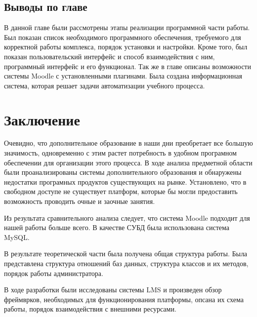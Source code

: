 \documentclass[a4paper,14pt]{article}
\begin{document}

\subsection{Выводы по главе}

В данной главе были рассмотрены этапы реализации программной части работы.
Был показан список необходимого программного обеспечения, требуемого для корректной работы комплекса, порядок установки и настройки.
Кроме того, был показан пользовательский интерфейс и способ взаимодействия с ним, программный интерфейс и его функционал.
Так же в главе описаны возможности системы Moodle с установленными плагинами.
Была создана информационная система, которая решает задачи автоматизации учебного процесса.



\section{Заключение}


Очевидно, что дополнительное образование в наши дни преобретает все большую значимость, одновременно с этим растет потребность в удобном програмном обеспечении для организации этого процесса.
В ходе анализа предметной области были проанализированы системы дополнительного образования и обнаружены недостатки програмных продуктов существующих на рынке.
Установлено, что в свободном доступе не существует платформ, которые бы могли предоставить возможность проводить очные и заочные занятия.

Из результата сравнительного анализа следует, что система Moodle подходит для нашей работы больше всего. В качестве СУБД была использована система MySQL.

В результате теоретической части была получена общая структура работы. Была представлена структура отношений баз данных, структура классов и их методов, порядок работы администратора.


В ходе разработки были исследованы системы 
LMS и произведен обзор фреймврков, необходимых для функционирования платформы, опсана их схема работы, порядок взаимодействия с внешними ресурсами.
\end{document}
